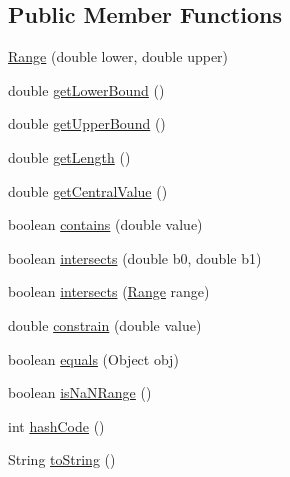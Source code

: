 \subsection*{Public Member Functions}
\begin{DoxyCompactItemize}
\item 
\mbox{\hyperlink{classorg_1_1jfree_1_1data_1_1_range_a4c6d51dd50e9a0c0ac2f675776095ef7}{Range}} (double lower, double upper)
\item 
double \mbox{\hyperlink{classorg_1_1jfree_1_1data_1_1_range_ac27eb47cfe21aa447b525de3f01eac58}{get\+Lower\+Bound}} ()
\item 
double \mbox{\hyperlink{classorg_1_1jfree_1_1data_1_1_range_a368a9e34ad6dbc70a93f8caaf1721900}{get\+Upper\+Bound}} ()
\item 
double \mbox{\hyperlink{classorg_1_1jfree_1_1data_1_1_range_aa67d9b07ecca735d9c21392a05600e85}{get\+Length}} ()
\item 
double \mbox{\hyperlink{classorg_1_1jfree_1_1data_1_1_range_a1b8603b887729e8d7fbbcd1697f83437}{get\+Central\+Value}} ()
\item 
boolean \mbox{\hyperlink{classorg_1_1jfree_1_1data_1_1_range_addc9ad1ee912f4cb13720d01beaa8f9c}{contains}} (double value)
\item 
boolean \mbox{\hyperlink{classorg_1_1jfree_1_1data_1_1_range_ab7b29fda62b57595ece93849843571ca}{intersects}} (double b0, double b1)
\item 
boolean \mbox{\hyperlink{classorg_1_1jfree_1_1data_1_1_range_a531d1be5f69bb9f0e79451c56c80f639}{intersects}} (\mbox{\hyperlink{classorg_1_1jfree_1_1data_1_1_range}{Range}} range)
\item 
double \mbox{\hyperlink{classorg_1_1jfree_1_1data_1_1_range_a1b4f861b494f28fa7c3775b70c5f166c}{constrain}} (double value)
\item 
boolean \mbox{\hyperlink{classorg_1_1jfree_1_1data_1_1_range_a94f2ce23991a0f78975d4f4c915bae40}{equals}} (Object obj)
\item 
boolean \mbox{\hyperlink{classorg_1_1jfree_1_1data_1_1_range_a09d0128e6e2048926d9a62baacd0059c}{is\+Na\+N\+Range}} ()
\item 
int \mbox{\hyperlink{classorg_1_1jfree_1_1data_1_1_range_abbc83890787b9fcab9dcfa2f76d7ac4f}{hash\+Code}} ()
\item 
String \mbox{\hyperlink{classorg_1_1jfree_1_1data_1_1_range_a3d6e27cdfeeed858c586feed83c95916}{to\+String}} ()
\end{DoxyCompactItemize}
